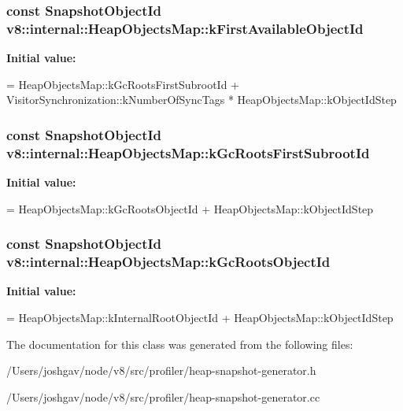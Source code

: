 \subsubsection[{\texorpdfstring{k\+First\+Available\+Object\+Id}{kFirstAvailableObjectId}}]{\setlength{\rightskip}{0pt plus 5cm}const Snapshot\+Object\+Id v8\+::internal\+::\+Heap\+Objects\+Map\+::k\+First\+Available\+Object\+Id\hspace{0.3cm}{\ttfamily [static]}}\hypertarget{classv8_1_1internal_1_1_heap_objects_map_a0424e15b8207599ea3fae3c69eb0fa26}{}\label{classv8_1_1internal_1_1_heap_objects_map_a0424e15b8207599ea3fae3c69eb0fa26}
{\bfseries Initial value\+:}
\begin{DoxyCode}
=
    HeapObjectsMap::kGcRootsFirstSubrootId +
    VisitorSynchronization::kNumberOfSyncTags * HeapObjectsMap::kObjectIdStep
\end{DoxyCode}
\subsubsection[{\texorpdfstring{k\+Gc\+Roots\+First\+Subroot\+Id}{kGcRootsFirstSubrootId}}]{\setlength{\rightskip}{0pt plus 5cm}const Snapshot\+Object\+Id v8\+::internal\+::\+Heap\+Objects\+Map\+::k\+Gc\+Roots\+First\+Subroot\+Id\hspace{0.3cm}{\ttfamily [static]}}\hypertarget{classv8_1_1internal_1_1_heap_objects_map_a1328bc87783492d376630e24758bbc69}{}\label{classv8_1_1internal_1_1_heap_objects_map_a1328bc87783492d376630e24758bbc69}
{\bfseries Initial value\+:}
\begin{DoxyCode}
=
    HeapObjectsMap::kGcRootsObjectId + HeapObjectsMap::kObjectIdStep
\end{DoxyCode}
\subsubsection[{\texorpdfstring{k\+Gc\+Roots\+Object\+Id}{kGcRootsObjectId}}]{\setlength{\rightskip}{0pt plus 5cm}const Snapshot\+Object\+Id v8\+::internal\+::\+Heap\+Objects\+Map\+::k\+Gc\+Roots\+Object\+Id\hspace{0.3cm}{\ttfamily [static]}}\hypertarget{classv8_1_1internal_1_1_heap_objects_map_abf649a7b9e771c6b8dbe9ef581d5eaac}{}\label{classv8_1_1internal_1_1_heap_objects_map_abf649a7b9e771c6b8dbe9ef581d5eaac}
{\bfseries Initial value\+:}
\begin{DoxyCode}
=
    HeapObjectsMap::kInternalRootObjectId + HeapObjectsMap::kObjectIdStep
\end{DoxyCode}


The documentation for this class was generated from the following files\+:\begin{DoxyCompactItemize}
\item 
/\+Users/joshgav/node/v8/src/profiler/heap-\/snapshot-\/generator.\+h\item 
/\+Users/joshgav/node/v8/src/profiler/heap-\/snapshot-\/generator.\+cc\end{DoxyCompactItemize}

